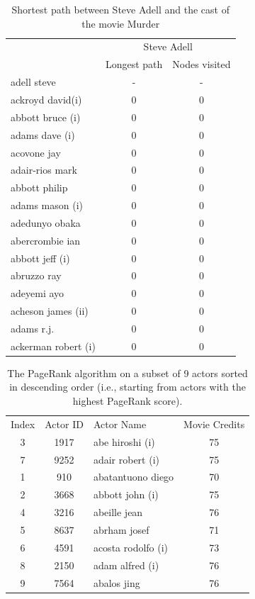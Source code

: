 \documentclass[12pt]{ieeeconf}      %
\begin{document}
\begin{table}[H]
\centering
\caption{Shortest path between Steve Adell and the cast of the movie Murder}
\label{table:steve}
\begin{tabular}{lcc}
 & \multicolumn{2}{c}{Steve Adell} \\
 & Longest path & Nodes visited \\
adell steve & - & - \\
ackroyd david(i) & 0 & 0 \\
abbott bruce (i) & 0 & 0 \\
adams dave (i) & 0 & 0 \\
acovone jay & 0 & 0 \\
adair-rios mark & 0 & 0 \\
abbott philip & 0 & 0 \\
adams mason (i) & 0 & 0 \\
adedunyo obaka & 0 & 0 \\
abercrombie ian & 0 & 0 \\
abbott jeff (i) & 0 & 0 \\
abruzzo ray & 0 & 0 \\
adeyemi ayo & 0 & 0 \\
acheson james (ii) & 0 & 0 \\
adams r.j. & 0 & 0 \\
ackerman robert (i) & 0 & 0
\end{tabular}
\end{table}

\begin{table}[H]
\centering
\caption{The PageRank algorithm on a subset of 9 actors sorted in descending order (i.e., starting from actors with the highest PageRank score).}
\label{pageranktable}
\begin{tabular}{cclc}
Index & Actor ID & Actor Name & Movie Credits\\
3 & 1917 & abe hiroshi (i) & 75\\
7 & 9252 & adair robert (i) & 75\\
1 & 910 & abatantuono diego & 70\\
2 & 3668 & abbott john (i) & 75\\
4 & 3216 & abeille jean & 76\\
5 & 8637 & abrham josef & 71\\
6 & 4591 & acosta rodolfo (i) & 73\\
8 & 2150 & adam alfred (i) & 76\\
9 & 7564 & abalos jing & 76\\
\end{tabular}
\end{table}
\end{document}
